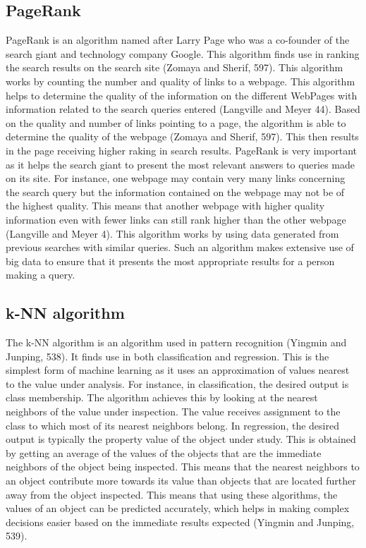 \documentclass[sigconf]{acmart}
\begin{document}
\subsection{PageRank}
PageRank is an algorithm named after Larry Page who was a co-founder of the search giant and technology company Google. This algorithm finds use in ranking the search results on the search site (Zomaya and Sherif, 597). This algorithm works by counting the number and quality of links to a webpage. This algorithm helps to determine the quality of the information on the different WebPages with information related to the search queries entered (Langville and Meyer 44). Based on the quality and number of links pointing to a page, the algorithm is able to determine the quality of the webpage (Zomaya and Sherif, 597). This then results in the page receiving higher raking in search results. PageRank is very important as it helps the search giant to present the most relevant answers to queries made on its site. 
For instance, one webpage may contain very many links concerning the search query but the information contained on the webpage may not be of the highest quality. This means that another webpage with higher quality information even with fewer links can still rank higher than the other webpage (Langville and Meyer 4). This algorithm works by using data generated from previous searches with similar queries. Such an algorithm makes extensive use of big data to ensure that it presents the most appropriate results for a person making a query. 


\subsection{k-NN algorithm}
The k-NN algorithm is an algorithm used in pattern recognition (Yingmin and Junping, 538). It finds use in both classification and regression. This is the simplest form of machine learning as it uses an approximation of values nearest to the value under analysis. For instance, in classification, the desired output is class membership. The algorithm achieves this by looking at the nearest neighbors of the value under inspection. The value receives assignment to the class to which most of its nearest neighbors belong. In regression, the desired output is typically the property value of the object under study. This is obtained by getting an average of the values of the objects that are the immediate neighbors of the object being inspected. This means that the nearest neighbors to an object contribute more towards its value than objects that are located further away from the object inspected. This means that using these algorithms, the values of an object can be predicted accurately, which helps in making complex decisions easier based on the immediate results expected (Yingmin and Junping, 539).
\end{document}
